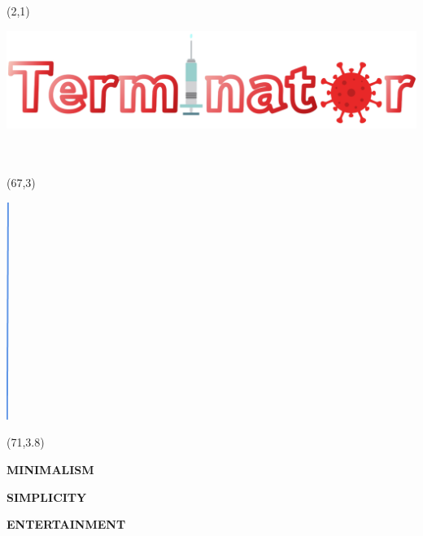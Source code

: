 \documentclass[hyperref={pdfpagelabels=false}]{beamer}
\begin{document}
\begin{frame}

	\begin{textblock}{45}(2,1)
		\begin{blankbox}
			\includegraphics[width=1000pt]{img/gamename.png} \\\hspace*{\fill} \\ \\
		\end{blankbox}
	\end{textblock}


\begin{turn}{60}
	\begin{textblock}{1}(67,3)
		\begin{blankbox}
			\centering
			\includegraphics[height=200pt]{img/aLine}
		\end{blankbox}
	\end{textblock}
\end{turn}


\begin{textblock}{20}(71,3.8)
		\begin{blankbox}
			\Huge\textbf{MINIMALISM}

\vspace{0.4cm}

			\textbf{SIMPLICITY}
\vspace{0.4cm}

\textbf{ENTERTAINMENT}
		\end{blankbox}
	\end{textblock}




\end{frame}
\end{document}
